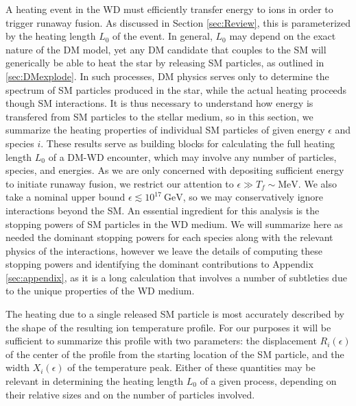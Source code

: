 \documentclass[twocolumn,showpacs,preprintnumbers,amsmath,amssymb,prd]{revtex4}
\newcommand{\GeV}{\text{GeV}}
\begin{document}
A heating event in the WD must efficiently transfer energy to ions in order to trigger runaway fusion.  
As discussed in Section \ref{sec:Review}, this is parameterized by the heating length $L_0$ of the event. 
In general, $L_0$ may depend on the exact nature of the DM model, yet any DM candidate that couples to the SM will generically be able to heat the star by releasing SM particles, as outlined in \ref{sec:DMexplode}.
In such processes, DM physics serves only to determine the spectrum of SM particles produced in the star, while the actual heating proceeds though SM interactions. 
It is thus necessary to understand how energy is transfered from SM particles to the stellar medium, so in this section, we summarize the heating properties of individual SM particles of given energy $\epsilon$ and species $i$. 
These results serve as building blocks for calculating the full heating length $L_0$ of a DM-WD encounter, which may involve any number of particles, species, and energies. 
As we are only concerned with depositing sufficient energy to initiate runaway fusion, we restrict our attention to $\epsilon \gg T_f \sim \text{MeV}$.
We also take a nominal upper bound $\epsilon \lesssim 10^{17} ~\GeV$, so we may conservatively ignore interactions beyond the SM. 
An essential ingredient for this analysis is the stopping powers of SM particles in the WD medium. 
We will summarize here as needed the dominant stopping powers for each species along with the relevant physics of the interactions, however we leave the details of computing these stopping powers and identifying the dominant contributions to Appendix \ref{sec:appendix}, as it is a long calculation that involves a number of subtleties due to the unique properties of the WD medium.

The heating due to a single released SM particle is most accurately described by the shape of the resulting ion temperature profile.
For our purposes it will be sufficient to summarize this profile with two parameters: the displacement $R_i(\epsilon)$ of the center of the profile from the starting location of the SM particle, and the width $X_i(\epsilon)$ of the temperature peak. 
Either of these quantities may be relevant in determining the heating length $L_0$ of a given process, depending on their relative sizes and on the number of particles involved.
\end{document}
